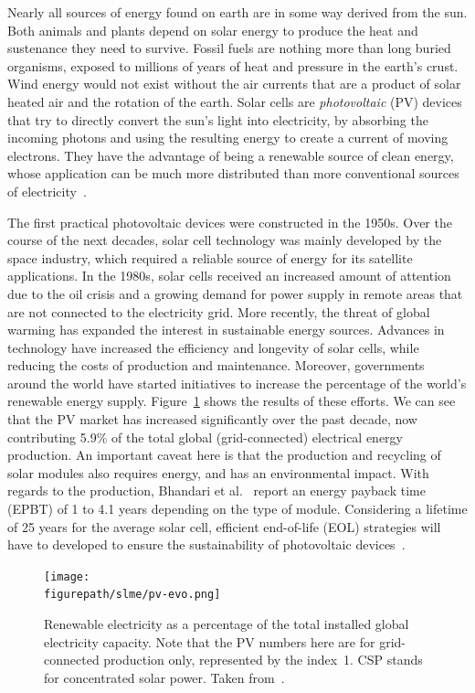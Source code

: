 \begin{refsection}
Nearly all sources of energy found on earth are in some way derived from the 
sun. Both animals and plants depend on solar energy to produce the heat and 
sustenance they need to survive. Fossil fuels are nothing more than long 
buried organisms, exposed to millions of years of heat and pressure in the 
earth's crust. Wind energy would not exist without the air currents that are a 
product of solar heated air and the rotation of the earth. Solar cells are 
\textit{photovoltaic} (PV) devices that try to directly convert the sun's 
light into electricity, by absorbing the incoming photons and using the 
resulting energy to create a current of moving electrons. They have the 
advantage of being a renewable source of clean energy, whose application can 
be much more distributed than more conventional sources of 
electricity~\cite{Marsden2011}. 
 
The first practical photovoltaic devices were constructed in the 1950s. Over 
the course of the next decades, solar cell technology was mainly developed by 
the space industry, which required a reliable source of energy for its 
satellite applications. In the 1980s, solar cells received an increased amount 
of attention due to the oil crisis and a growing demand for power supply in 
remote areas that are not connected to the electricity grid. More recently, 
the threat of global warming has expanded the interest in sustainable energy 
sources. Advances in technology have increased the efficiency and longevity of 
solar cells, while reducing the costs of production and maintenance. 
Moreover, governments around the world have started initiatives to increase the 
percentage of the world's renewable energy supply. 
Figure~\ref{slme:fig-pv_evo} shows the results of these efforts. We can see 
that the PV market has increased significantly over the past decade, now 
contributing 5.9\% of the total global (grid-connected) electrical energy production. 
An important caveat here is that the production and recycling of solar modules 
also requires energy, and has an environmental impact. With regards to the 
production, Bhandari et al.~\cite{Bhandari2015} report an energy payback 
time (EPBT) of 1 to 4.1 years depending on the type of module. Considering 
a lifetime of 25 years for the average solar cell, efficient end-of-life (EOL) 
strategies will have to developed to ensure the sustainability of photovoltaic 
devices~\cite{Chowdhury2020}.
 
\begin{figure}[hb]  
\centering 
\texttt{[image: \\figurepath/slme/pv-evo.png]} 
\caption{Renewable electricity as a percentage of the total installed global 
electricity capacity. Note that the PV numbers here are for grid-connected production only, represented by the index~1. CSP stands for concentrated solar power. Taken from~\cite{NREL2017}.}
\label{slme:fig-pv_evo}  
\end{figure}  


\end{refsection}
